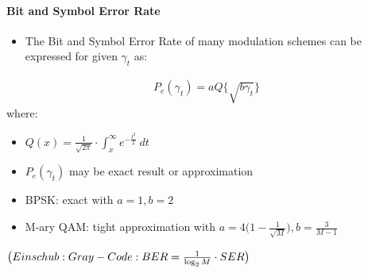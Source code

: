 \documentclass[a4paper, 10pt]{article}
\begin{document}
\paragraph{Bit and Symbol Error Rate}
\begin{itemize}
	\item The Bit and Symbol Error Rate of many modulation schemes can be expressed for given $\gamma_t$ as:
\end{itemize}
\begin{align*}
	P_e(\gamma_t) = aQ\bigl\{ \sqrt{b\gamma_t}\bigr\}
\end{align*}
where:
\begin{itemize}
	\item $Q(x) = \frac{1}{\sqrt{2\pi}}\cdot\int_{x}^{\infty} e^{-\frac{t^2}{2}}~dt$
	\item $P_e(\gamma_t)$ may be exact result or approximation
	\item BPSK: exact with $a = 1, b = 2$
	\item M-ary QAM: tight approximation with $a = 4\bigl (1-\frac{1}{\sqrt{M}}\bigr ), b =  \frac{3}{M - 1}$
\end{itemize}
\begin{math} \bigl ({\small Einschub: Gray-Code: {BER} = \frac{1}{\log_2M} \cdot {SER} }\bigr ) \end{math}
\end{document}
